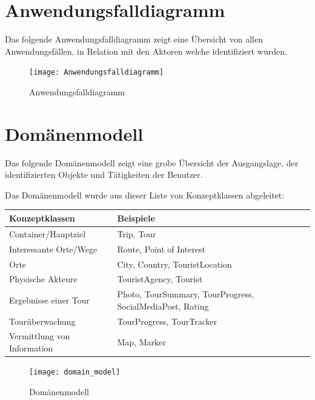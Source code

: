 \documentclass[a4paper,10pt,xetex]{article}
\begin{document}
\section{Anwendungsfalldiagramm}\label{anwendungsfalldiagramm}
Das folgende Anwendungsfalldiagramm zeigt eine Übersicht von allen Anwendungsfällen, in Relation mit den Aktoren welche identifiziert wurden.

\begin{figure}
  \centering
  \texttt{[image: Anwendungsfalldiagramm]}
  \caption{Anwendungsfalldiagramm}
\end{figure}


\section{Domänenmodell}\label{domaenenmodell}
Das folgende Domänenmodell zeigt eine grobe Übersicht der Ausgangslage,
der identifizierten Objekte und Tätigkeiten der Benutzer.

Das Domänenmodell wurde aus dieser Liste von Konzeptklassen abgeleitet:

\begin{longtabu} to \textwidth { | l | X[l] | }
\hline
\textbf{Konzeptklassen} & \textbf{Beispiele} \\\hline
\endhead
Container/Hauptziel         & Trip, Tour                                               \\\hline
Interessante Orte/Wege     & Route, Point of Interest                                \\\hline
Orte                       & City, Country, TouristLocation                           \\\hline
Physische Akteure          & TouristAgency, Tourist                                   \\\hline
Ergebnisse einer Tour      & Photo, TourSummary, TourProgress, SocialMediaPost, Rating \\\hline
Tourüberwachung           & TourProgress, TourTracker                                \\\hline
Vermittlung von Information & Map, Marker                                              \\\hline
\end{longtabu}

\begin{figure}
  \centering
  \texttt{[image: domain\_model]}
  \caption{Domänenmodell}
\end{figure}
\end{document}
